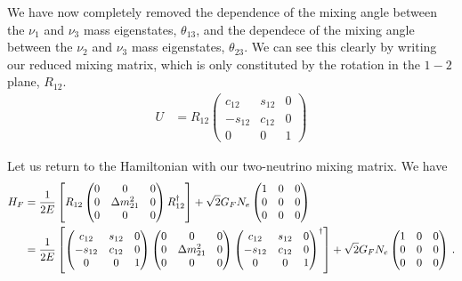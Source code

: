 We have now completely removed the dependence of the mixing angle between the $\nu_1$ and $\nu_3$ mass eigenstates, $\theta_{13}$, and the dependece of the mixing angle between the $\nu_2$ and $\nu_3$ mass eigenstates, $\theta_{23}$.
We can see this clearly by writing our reduced mixing matrix, which is only constituted by the rotation in the $1-2$ plane, $R_{12}$.
\begin{align}
    U &= R_{12}
\begin{pmatrix}c_{12} & s_{12} & 0 \\ -s_{12} & c_{12} & 0 \\ 0 & 0 & 1 \end{pmatrix} 
\end{align}

Let us return to the Hamiltonian with our two-neutrino mixing matrix. We have 
\begin{align}
    H_F
        &= \frac{1}{2E}\left[R_{12} \begin{pmatrix}
            0 & 0 & 0 \\
            0 & \dm_{21} & 0 \\
            0 & 0 & 0
        \end{pmatrix} R_{12}^\dagger\right] + \sqrt{2}G_F N_e \begin{pmatrix}
            1 & 0 & 0 \\
            0 & 0 & 0 \\
            0 & 0 & 0
        \end{pmatrix} \nonumber \\
        &= \frac{1}{2E}\left[\begin{pmatrix}c_{12} & s_{12} & 0 \\ -s_{12} & c_{12} & 0 \\ 0 & 0 & 1 \end{pmatrix}  \begin{pmatrix}
            0 & 0 & 0 \\
            0 & \dm_{21} & 0 \\
            0 & 0 & 0
        \end{pmatrix} \begin{pmatrix}c_{12} & s_{12} & 0 \\ -s_{12} & c_{12} & 0 \\ 0 & 0 & 1 \end{pmatrix}^\dagger \right] + \sqrt{2}G_F N_e \begin{pmatrix}
            1 & 0 & 0 \\
            0 & 0 & 0 \\
            0 & 0 & 0
        \end{pmatrix}\,. 
\end{align}

